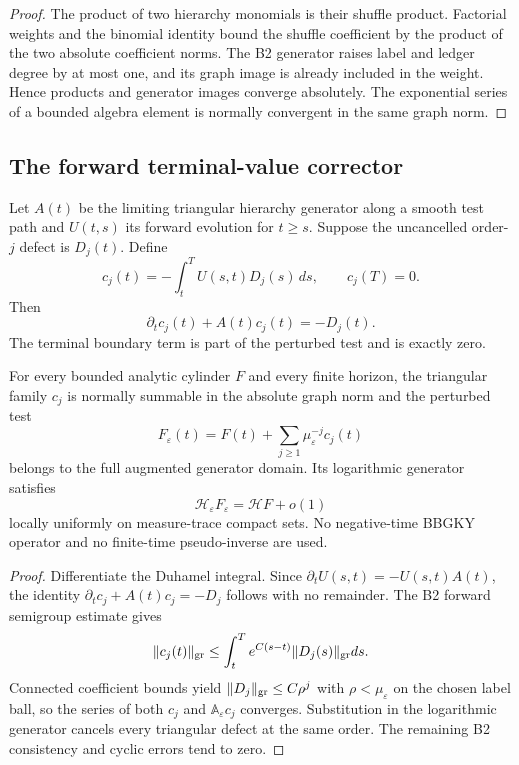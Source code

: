 \begin{proof}
The product of two hierarchy monomials is their shuffle product.  Factorial
weights and the binomial identity bound the shuffle coefficient by the product
of the two absolute coefficient norms.  The B2 generator raises label and
ledger degree by at most one, and its graph image is already included in the
weight.  Hence products and generator images converge absolutely.  The
exponential series of a bounded algebra element is normally convergent in the
same graph norm.
\end{proof}

\subsection{The forward terminal-value corrector}

Let $A(t)$ be the limiting triangular hierarchy generator along a smooth test
path and $U(t,s)$ its forward evolution for $t\ge s$.  Suppose the uncancelled
order-$j$ defect is $D_j(t)$.  Define
\[
 c_j(t)=-\int_t^T U(s,t)D_j(s)\,ds,
 \qquad c_j(T)=0.
\]
Then
\[
 \partial_t c_j(t)+A(t)c_j(t)=-D_j(t).
\]
The terminal boundary term is part of the perturbed test and is exactly zero.

\begin{theorem}
\label{thm:r7-b4-corrector}
For every bounded analytic cylinder $F$ and every finite horizon, the
triangular family $c_j$ is normally summable in the absolute graph norm and the
perturbed test
\[
 F_\varepsilon(t)=F(t)+\sum_{j\ge1}\mu_\varepsilon^{-j}c_j(t)
\]
belongs to the full augmented generator domain.  Its logarithmic generator
satisfies
\[
 \mathcal H_\varepsilon F_\varepsilon
 =\mathcal H F+o(1)
\]
locally uniformly on measure-trace compact sets.  No negative-time BBGKY
operator and no finite-time pseudo-inverse are used.
\end{theorem}

\begin{proof}
Differentiate the Duhamel integral.  Since
$\partial_tU(s,t)=-U(s,t)A(t)$, the identity
$\partial_tc_j+A(t)c_j=-D_j$ follows with no remainder.  The B2 forward
semigroup estimate gives
\[
 \|c_j(t)\|_{\rm gr}
 \le\int_t^Te^{C(s-t)}\|D_j(s)\|_{\rm gr}ds.
\]
Connected coefficient bounds yield
$\|D_j\|_{\rm gr}\le C\rho^j$ with $\rho<\mu_\varepsilon$ on the chosen label
ball, so the series of both $c_j$ and $\mathbb A_\varepsilon c_j$ converges.
Substitution in the logarithmic generator cancels every triangular defect at
the same order.  The remaining B2 consistency and cyclic errors tend to zero.
\end{proof}

